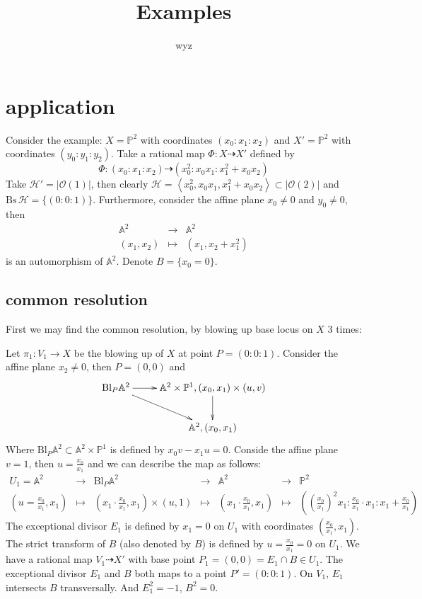 \documentclass{article}
\title{Examples}
\author{wyz}
\begin{document}
  \maketitle
  \tableofcontents
\section{application}
Consider the example: $ X=\mathbb{P}^2 $ with coordinates $ (x_0:x_1:x_2) $ and $ X'=\mathbb{P}^2 $ with coordinates $ (y_0:y_1:y_2) $. Take a rational map $ \Phi:X\dashrightarrow X' $ defined by 
$$ \Phi:(x_0:x_1:x_2)\dashrightarrow (x_0^2:x_0x_1:x_1^2+x_0x_2) $$
Take $ \mathcal{H}'=|\mathcal{O}(1)| $, then clearly $ \mathcal{H}=\left<x_0^2,x_0x_1,x_1^2+x_0x_2\right>\subset |\mathcal{O}(2)| $  and $ \mathrm{Bs}\,\mathcal{H}=\{(0:0:1)\} $. Furthermore, consider the affine plane $ x_0\neq 0 $ and $ y_0\neq 0 $, then
$$ \begin{array}{rcl}
  \mathbb{A}^2&\to&\mathbb{A}^2\\
  (x_1,x_2)&\mapsto&(x_1,x_2+x_1^2)
\end{array} $$
is an automorphism of $ \mathbb{A}^2 $. Denote $ B=\{x_0=0\} $.
\subsection{common resolution}
First we may find the common resolution, by blowing up base locus on $ X $ 3 times:

Let $ \pi_1:V_1\to X $ be the blowing up of $ X $ at point $ P=(0:0:1) $. Consider the affine plane $ x_2\neq 0 $, then $ P=(0,0) $ and
$$ \xymatrix{
  \mathrm{Bl}_P\mathbb{A}^2\ar[r]\ar[rd]&\mathbb{A}^2\times \mathbb{P}^1,(x_0,x_1)\times (u,v)\ar[d]\\
  &\mathbb{A}^2,(x_0,x_1)	} $$
Where $ \mathrm{Bl}_P\mathbb{A}^2\subset \mathbb{A}^2\times \mathbb{P}^1 $ is defined by $ x_0v-x_1u=0 $. Conside the affine plane $ v=1 $, then $ u=\frac{x_0}{x_1} $ and we can describe the map as follows:
$$ \begin{array}{rcccccc}
  U_1=\mathbb{A}^2&\to&\mathrm{Bl}_P\mathbb{A}^2&\to&\mathbb{A}^2&\to&\mathbb{P}^2 \\
  (u=\frac{x_0}{x_1},x_1)&\mapsto&(x_1\cdot \frac{x_0}{x_1},x_1)\times (u,1)&\mapsto&(x_1\cdot \frac{x_0}{x_1},x_1)&\mapsto &((\frac{x_0}{x_1})^2x_1:\frac{x_0}{x_1}\cdot x_1:x_1+\frac{x_0}{x_1})
\end{array} $$
The exceptional divisor $ E_1 $ is defined by $ x_1=0 $ on $ U_1 $ with coordinates $ (\frac{x_0}{x_1},x_1) $. The strict transform of $ B $ (also denoted by $ B $) is defined by $ u=\frac{x_0}{x_1}=0 $ on $ U_1 $. We have a rational map $ V_1\dashrightarrow X' $ with base point $ P_1=(0,0)=E_1\cap B\in U_1 $. The exceptional divisor $ E_1 $ and $ B $ both maps to a point $ P'=(0:0:1) $. On $ V_1 $, $ E_1 $ intersects $ B $ transversally. And $ E_1^2=-1 $, $ B^2=0 $.
\end{document}
